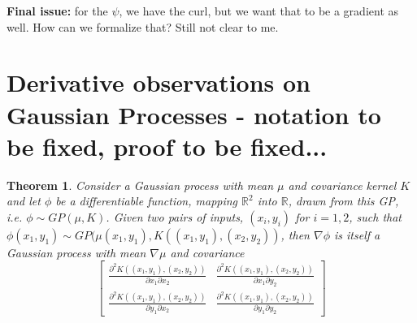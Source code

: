 \documentclass[11pt,a4paper]{article}
\newtheorem{theorem}{Theorem}
\begin{document}
\textbf{Final issue:} for the $\psi$, we have the curl, but we want that to be a gradient as well. How can we formalize that? Still not clear to me. 
\newpage

\section*{Derivative observations on Gaussian Processes - notation to be fixed, proof to be fixed...}

\begin{theorem}
Consider a Gaussian process with mean $\mu$ and covariance kernel $K$ and let $\phi$ be a differentiable function, mapping $\mathbb{R}^2$ into $\mathbb{R}$, drawn from this GP, i.e. $\phi \sim \textit{GP}(\mu, K)$. Given two pairs of inputs, $(x_i,y_i)$ for $i=1,2$, such that $\phi(x_1,y_1) \sim \textit{GP}(\mu(x_1,y_1), K((x_1,y_1), (x_2,y_2))$, then $\nabla \phi$ is itself a Gaussian process with mean $\nabla \mu$ and covariance
$$
\begin{bmatrix}
\frac{\partial^2 K((x_1,y_1), (x_2,y_2))}{\partial x_1 \partial x_2} & \frac{\partial^2 K((x_1,y_1), (x_2,y_2))}{\partial x_1 \partial y_2}\\
\frac{\partial^2 K((x_1,y_1), (x_2,y_2))}{\partial y_1 \partial x_2} & \frac{\partial^2 K((x_1,y_1), (x_2,y_2))}{\partial y_1 \partial y_2}
\end{bmatrix}
$$
\end{theorem}
\end{document}
